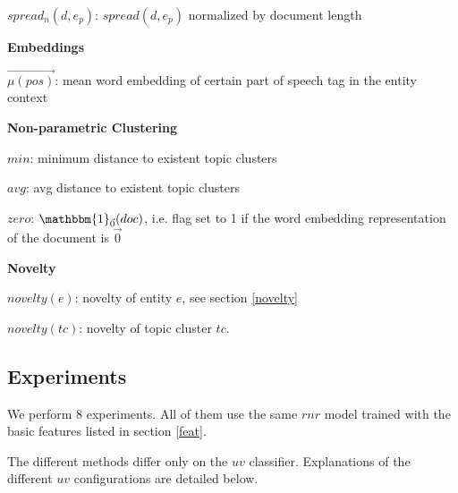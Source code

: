 \documentclass{article}
\begin{document}
\begin{itemize*}
\begin{itemize*}
\begin{itemize*}
            \item $spread_n(d,e_p)$: $spread(d,e_p)$ normalized by document length
        \end{itemize*}
    \end{itemize*}
  \item \textbf{Embeddings}
    \begin{itemize*}
        \item $\vec{\mu(pos)}$: mean word embedding of certain part of speech tag in the entity context
    \end{itemize*}
  \item \textbf{Non-parametric Clustering}
    \begin{itemize*}
        \item $min$: minimum distance to existent topic clusters
        \item $avg$: avg distance to existent topic clusters
        \item $zero$: $\mathbbm{1}_{\vec{0}}{(doc)}$, i.e. flag set to 1 if the word embedding representation of the document is $\vec{0}$
    \end{itemize*}
  \item \textbf{Novelty}
    \begin{itemize*}
        \item $novelty(e)$: novelty of entity $e$, see section \ref{novelty}
        \item $novelty(tc)$: novelty of topic cluster $tc$.
    \end{itemize*}
\end{itemize*}


\subsection{Experiments}

We perform 8 experiments. All of them use the same $rnr$ model trained with the basic features listed in section \ref{feat}.

The different methods differ only on the $uv$ classifier. Explanations of the different $uv$ configurations are detailed below.
\end{document}
